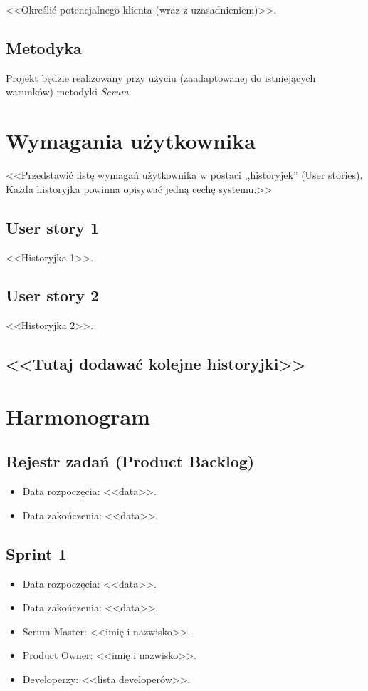 \documentclass[a4paper]{amsart}
\begin{document}
<<Określić potencjalnego klienta (wraz z uzasadnieniem)>>.

\subsection{Metodyka}

Projekt będzie realizowany przy użyciu (zaadaptowanej do istniejących warunków) metodyki {\em Scrum}. 

\section{Wymagania użytkownika}
<<Przedstawić listę wymagań użytkownika w postaci ,,historyjek'' (User stories). Każda historyjka powinna opisywać jedną cechę systemu.>>

\subsection{User story 1}
<<Historyjka 1>>.

\subsection{User story 2}
<<Historyjka 2>>.

\subsection*{<<Tutaj dodawać kolejne historyjki>>}

\section{Harmonogram}

\subsection{Rejestr zadań (Product Backlog)}

\begin{itemize}
\item Data rozpoczęcia: <<data>>.
\item  Data zakończenia: <<data>>.
\end{itemize}

\subsection{Sprint 1}

\begin{itemize}
\item Data rozpoczęcia: <<data>>.
\item Data zakończenia: <<data>>.
\item Scrum Master: <<imię i nazwisko>>.
\item Product Owner: <<imię i nazwisko>>.
\item Developerzy: <<lista developerów>>.
\end{itemize}
\end{document}
